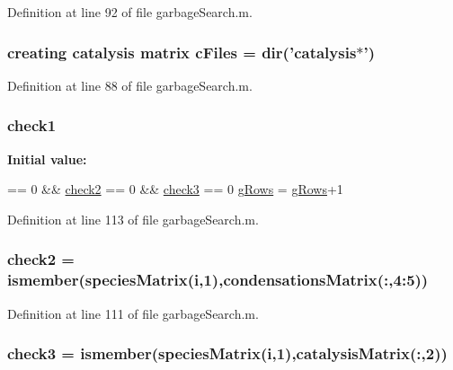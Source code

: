 Definition at line 92 of file garbage\-Search.\-m.

\hypertarget{a00021_a9eab57ccb42a39c704f47dc30e4f4515}{
\subsubsection[{c\-Files}]{\setlength{\rightskip}{0pt plus 5cm}creating {\bf catalysis} matrix c\-Files = {\bf dir}('{\bf catalysis}$\ast$')}}\label{a00021_a9eab57ccb42a39c704f47dc30e4f4515}


Definition at line 88 of file garbage\-Search.\-m.

\hypertarget{a00021_a62c10db322670bdabb633eb294c4fcec}{
\subsubsection[{check1}]{ check1}}\label{a00021_a62c10db322670bdabb633eb294c4fcec}
{\bfseries Initial value\-:}
\begin{DoxyCode}
== 0 && \hyperlink{a00021_a98a8838a85ed24032563a44271b1525a}{check2} == 0 && \hyperlink{a00021_adfd17509248a56986475a25ee50fe488}{check3} == 0
            \hyperlink{a00021_af33e0ef530936979d29418a30cb262d0}{gRows} = \hyperlink{a00021_af33e0ef530936979d29418a30cb262d0}{gRows}+1
\end{DoxyCode}


Definition at line 113 of file garbage\-Search.\-m.

\hypertarget{a00021_a98a8838a85ed24032563a44271b1525a}{
\subsubsection[{check2}]{\setlength{\rightskip}{0pt plus 5cm}check2 = ismember({\bf species\-Matrix}({\bf i},1),{\bf condensations\-Matrix}(\-:,4\-:5))}}\label{a00021_a98a8838a85ed24032563a44271b1525a}


Definition at line 111 of file garbage\-Search.\-m.

\hypertarget{a00021_adfd17509248a56986475a25ee50fe488}{
\subsubsection[{check3}]{\setlength{\rightskip}{0pt plus 5cm}check3 = ismember({\bf species\-Matrix}({\bf i},1),{\bf catalysis\-Matrix}(\-:,2))}}\label{a00021_adfd17509248a56986475a25ee50fe488}


